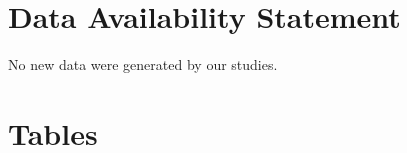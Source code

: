 \documentclass[utf8]{FrontiersinHarvard} %
\begin{document}
\section*{Data Availability Statement}

No new data were generated by our studies.


\nocite{*}



\clearpage

\section*{Tables}
\end{document}
